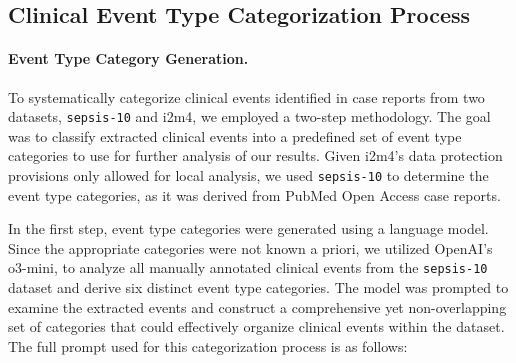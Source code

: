\documentclass[pmlr,twocolumn,10pt]{jmlr} %
\begin{document}
\subsection{Clinical Event Type Categorization Process}
\paragraph{Event Type Category Generation.}
To systematically categorize clinical events identified in case reports from two datasets, \texttt{sepsis-10} and i2m4, we employed a two-step methodology. 
The goal was to classify extracted clinical events into a predefined set of event type categories to use for further analysis of our results. 
Given i2m4's data protection provisions only allowed for local analysis, we used \texttt{sepsis-10} to determine the event type categories, as it was derived from PubMed Open Access case reports.

In the first step, event type categories were generated using a language model. 
Since the appropriate categories were not known a priori, we utilized OpenAI's o3-mini, to analyze all manually annotated clinical events from the \texttt{sepsis-10} dataset and derive six distinct event type categories. 
The model was prompted to examine the extracted events and construct a comprehensive yet non-overlapping set of categories that could effectively organize clinical events within the dataset. 
The full prompt used for this categorization process is as follows:
\end{document}
